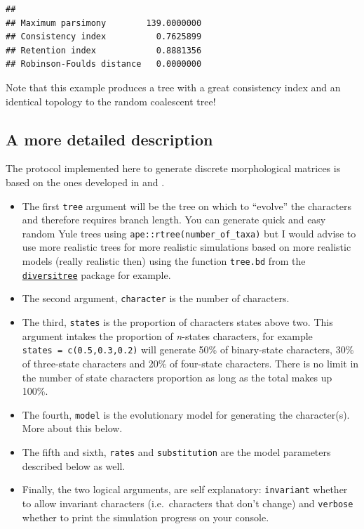 \documentclass[]{book}
\providecommand{\tightlist}{%
  \setlength{\itemsep}{0pt}\setlength{\parskip}{0pt}}
\theoremstyle{definition}
\theoremstyle{definition}
\theoremstyle{remark}
\begin{document}
\begin{verbatim}
##                                     
## Maximum parsimony        139.0000000
## Consistency index          0.7625899
## Retention index            0.8881356
## Robinson-Foulds distance   0.0000000
\end{verbatim}

Note that this example produces a tree with a great consistency index
and an identical topology to the random coalescent tree!

\subsection{A more detailed
description}\label{a-more-detailed-description}

The protocol implemented here to generate discrete morphological
matrices is based on the ones developed in \citet{GuillermeCooper}
\citet{OReilly2016} \citet{puttick2017uncertain} and
\citet{OReilly2017}.

\begin{itemize}
\tightlist
\item
  The first \texttt{tree} argument will be the tree on which to
  ``evolve'' the characters and therefore requires branch length. You
  can generate quick and easy random Yule trees using
  \texttt{ape::rtree(number\_of\_taxa)} but I would advise to use more
  realistic trees for more realistic simulations based on more realistic
  models (really realistic then) using the function \texttt{tree.bd}
  from the
  \href{http://www.zoology.ubc.ca/prog/diversitree/}{\texttt{diversitree}}
  package \citep{fitzjohndiversitree2012} for example.
\item
  The second argument, \texttt{character} is the number of characters.
\item
  The third, \texttt{states} is the proportion of characters states
  above two. This argument intakes the proportion of \emph{n}-states
  characters, for example \texttt{states\ =\ c(0.5,0.3,0.2)} will
  generate 50\% of binary-state characters, 30\% of three-state
  characters and 20\% of four-state characters. There is no limit in the
  number of state characters proportion as long as the total makes up
  100\%.
\item
  The fourth, \texttt{model} is the evolutionary model for generating
  the character(s). More about this below.
\item
  The fifth and sixth, \texttt{rates} and \texttt{substitution} are the
  model parameters described below as well.
\item
  Finally, the two logical arguments, are self explanatory:
  \texttt{invariant} whether to allow invariant characters
  (i.e.~characters that don't change) and \texttt{verbose} whether to
  print the simulation progress on your console.
\end{itemize}
\end{document}
